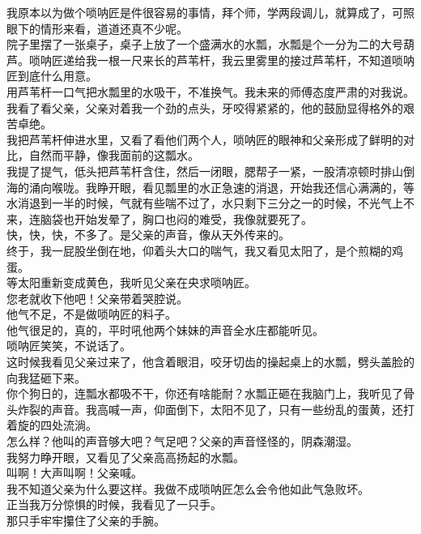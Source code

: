 我原本以为做个唢呐匠是件很容易的事情，拜个师，学两段调儿，就算成了，可照眼下的情形来看，道道还真不少呢。
\\

院子里摆了一张桌子，桌子上放了一个盛满水的水瓢，水瓢是个一分为二的大号葫芦。唢呐匠递给我一根一尺来长的芦苇杆，我云里雾里的接过芦苇杆，不知道唢呐匠到底什么用意。
\\

用芦苇杆一口气把水瓢里的水吸干，不准换气。我未来的师傅态度严肃的对我说。
\\

我看了看父亲，父亲对着我一个劲的点头，牙咬得紧紧的，他的鼓励显得格外的艰苦卓绝。
\\

我把芦苇杆伸进水里，又看了看他们两个人，唢呐匠的眼神和父亲形成了鲜明的对比，自然而平静，像我面前的这瓢水。
\\

我提了提气，低头把芦苇杆含住，然后一闭眼，腮帮子一紧，一股清凉顿时排山倒海的涌向喉咙。我睁开眼，看见瓢里的水正急速的消退，开始我还信心满满的，等水消退到一半的时候，气就有些喘不过了，水只剩下三分之一的时候，不光气上不来，连脑袋也开始发晕了，胸口也闷的难受，我像就要死了。
\\

快，快，快，不多了。是父亲的声音，像从天外传来的。
\\

终于，我一屁股坐倒在地，仰着头大口的喘气，我又看见太阳了，是个煎糊的鸡蛋。
\\

等太阳重新变成黄色，我听见父亲在央求唢呐匠。
\\

您老就收下他吧！父亲带着哭腔说。
\\

他气不足，不是做唢呐匠的料子。
\\

他气很足的，真的，平时吼他两个妹妹的声音全水庄都能听见。
\\

唢呐匠笑笑，不说话了。
\\

这时候我看见父亲过来了，他含着眼泪，咬牙切齿的操起桌上的水瓢，劈头盖脸的向我猛砸下来。
\\

你个狗日的，连瓢水都吸不干，你还有啥能耐？水瓢正砸在我脑门上，我听见了骨头炸裂的声音。我高喊一声，仰面倒下，太阳不见了，只有一些纷乱的蛋黄，还打着旋的四处流淌。
\\

怎么样？他叫的声音够大吧？气足吧？父亲的声音怪怪的，阴森潮湿。
\\

我努力睁开眼，又看见了父亲高高扬起的水瓢。
\\

叫啊！大声叫啊！父亲喊。
\\

我不知道父亲为什么要这样。我做不成唢呐匠怎么会令他如此气急败坏。
\\

正当我万分惊惧的时候，我看见了一只手。
\\

那只手牢牢攥住了父亲的手腕。\\